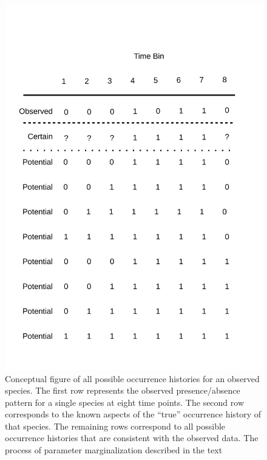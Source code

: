 \documentclass[12pt,letterpaper]{article}
\begin{document}
\begin{figure}[ht]
  \centering
  \includegraphics[height=0.5\textheight, width=\textwidth, keepaspectratio=true]{figure/margin}
  \caption[Conceptual figure of all possible occurrence histories for an observed species]{Conceptual figure of all possible occurrence histories for an observed species. The first row represents the observed presence/absence pattern for a single species at eight time points. The second row corresponds to the known aspects of the ``true'' occurrence history of that species. The remaining rows correspond to all possible occurrence histories that are consistent with the observed data. The process of parameter marginalization described in the text}
  \label{fig:margin_concept}
\end{figure}


\end{document}
